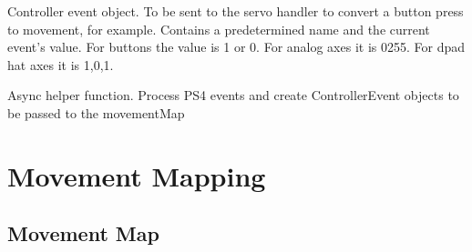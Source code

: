 \documentclass[letterpaper,10pt,english]{sphinxmanual}
\begin{document}
\begin{fulllineitems}
\label{\detokenize{manualcontrol:manualControl.ControllerEvent}}
\sphinxAtStartPar
Controller event object. To be sent to the servo handler to convert a button press to movement, for example. 
Contains a predetermined name and the current event’s value. 
For buttons the value is 1 or 0. For analog axes it is 0\sphinxhyphen{}255. For d\sphinxhyphen{}pad hat axes it is \sphinxhyphen{}1,0,1.

\end{fulllineitems}


\begin{fulllineitems}
\label{\detokenize{manualcontrol:manualControl.process_events}}
\sphinxAtStartPar
Async helper function. Process PS4 events and create ControllerEvent objects to be passed to the movementMap

\end{fulllineitems}



\chapter{Movement Mapping}
\label{\detokenize{mapping:movement-mapping}}\label{\detokenize{mapping::doc}}

\section{Movement Map}
\label{\detokenize{movementmap:module-MovementMap}}\label{\detokenize{movementmap:movement-map}}\label{\detokenize{movementmap::doc}}
\end{document}
